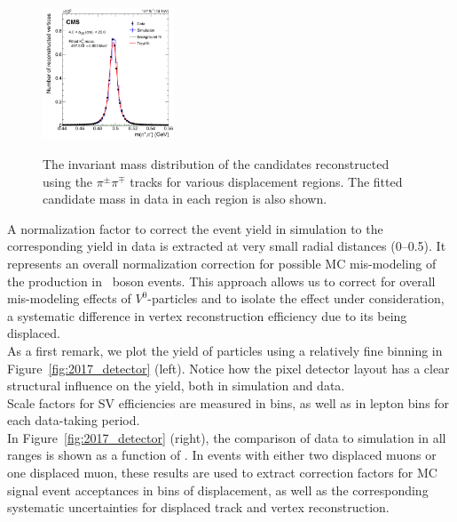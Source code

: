 \begin{figure}[h!]
    \includegraphics[width=0.35\textwidth]{Figures/paper/ksinvmass_run2_fig_3.pdf} \\
    \caption{\label{fig:invmass_mumuskim}
        The invariant mass distribution of the \PKzS candidates reconstructed using the $\pi^{\pm}\pi^{\mp}$ tracks for various displacement regions. The fitted \PKzS candidate mass in data in each region is also shown. \luka}
\end{figure}

A normalization factor to correct the event yield in
simulation to the corresponding yield in data is extracted at very small radial
distances (0--0.5\cm). It represents an overall
normalization correction for possible MC mis-modeling of the
\PKzS production in \PZ~boson events. This approach allows us to correct for
overall mis-modeling effects of $V^0$-particles
and to isolate the effect under consideration, \ie a systematic
difference in vertex reconstruction efficiency due to its being
displaced. \\
As a first remark, 
we plot the yield of \PKzS particles using a
relatively fine binning in Figure~\ref{fig:2017_detector} (left). Notice how the pixel detector layout has a clear structural influence on the yield, both in simulation and data.\\
Scale factors for SV efficiencies are
measured in \Deltwod bins, as
well as in lepton \pt bins for each data-taking period.\\
In Figure~\ref{fig:2017_detector} (right), the comparison of data to
simulation in all \pt ranges is shown as a function of \Deltwod.
In events with either two displaced muons or one displaced muon, these results are used to
extract correction factors for MC signal
event acceptances in bins of displacement, as well as the corresponding systematic
uncertainties for displaced track and vertex reconstruction.

